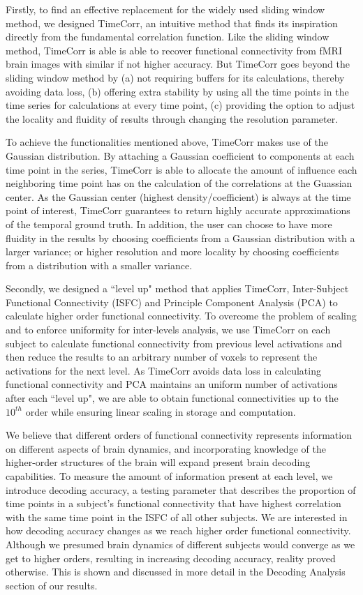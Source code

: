 \documentclass[11pt]{article}
\begin{document}
Firstly, to find an effective replacement for the widely used sliding window method, we designed TimeCorr, an intuitive method that finds its inspiration directly from the fundamental correlation function. Like the sliding window method, TimeCorr is able is able to recover functional connectivity from fMRI brain images with similar if not higher accuracy. But TimeCorr goes beyond the sliding window method by (a) not requiring buffers for its calculations, thereby avoiding data loss, (b) offering extra stability by using all the time points in the time series for calculations at every time point, (c) providing the option to adjust the locality and fluidity of results through changing the resolution parameter.

To achieve the functionalities mentioned above, TimeCorr makes use of the Gaussian distribution. By attaching a Gaussian coefficient to components at each time point in the series, TimeCorr is able to allocate the amount of influence each neighboring time point has on the calculation of the correlations at the Guassian center. As the Gaussian center (highest density/coefficient) is always at the time point of interest, TimeCorr guarantees to return highly accurate approximations of the temporal ground truth. In addition, the user can choose to have more fluidity in the results by choosing coefficients from a Gaussian distribution with a larger variance; or higher resolution and more locality by choosing coefficients from a distribution with a smaller variance.

Secondly, we designed a ``level up" method that applies TimeCorr, Inter-Subject Functional Connectivity (ISFC) and Principle Component Analysis (PCA) to calculate higher order functional connectivity. To overcome the problem of scaling and to enforce uniformity for inter-levels analysis, we use TimeCorr on each subject to calculate functional connectivity from previous level activations and then reduce the results to an arbitrary number of voxels to represent the activations for the next level. As TimeCorr avoids data loss in calculating functional connectivity and PCA maintains an uniform number of activations after each ``level up", we are able to obtain functional connectivities up to the $10^{th}$ order while ensuring linear scaling in storage and computation.

We believe that different orders of functional connectivity represents information on different aspects of brain dynamics, and incorporating knowledge of the higher-order structures of the brain will expand present brain decoding capabilities. To measure the amount of information present at each level, we introduce decoding accuracy, a testing parameter that describes the proportion of time points in a subject's functional connectivity that have highest correlation with the same time point in the ISFC of all other subjects. We are interested in how decoding accuracy changes as we reach higher order functional connectivity. Although we presumed brain dynamics of different subjects would converge as we get to higher orders, resulting in increasing decoding accuracy, reality proved otherwise. This is shown and discussed in more detail in the Decoding Analysis section of our results.
\end{document}

